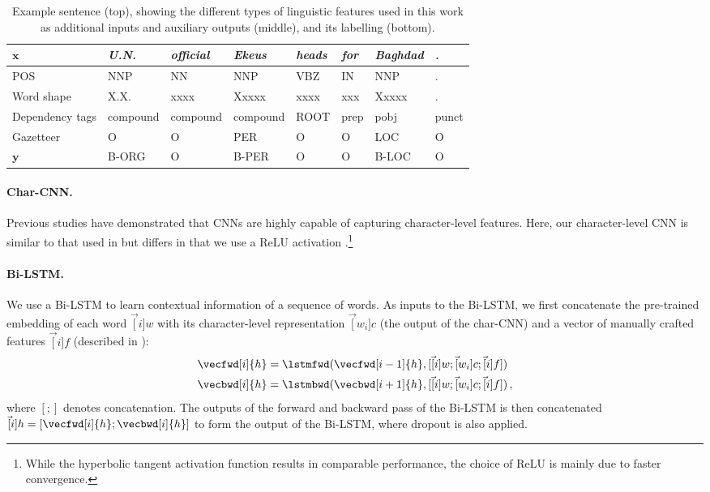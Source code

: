 \begin{table}[!t]
\centering
\small
\begin{tabular}{llllllll}
\toprule
$\mathbf{x}$           & \em U.N.     & \em official & \em  Ekeus    & \em heads & \em for  & \em Baghdad & \em .     \\ 
\midrule
POS        & NNP      & NN       & NNP      & VBZ   & IN   & NNP     & .     \\ 
Word shape      & X.X.     & xxxx     & Xxxxx    & xxxx  & xxx  & Xxxxx   & .     \\ 
Dependency tags & compound & compound & compound & ROOT  & prep & pobj    & punct \\ 
Gazetteer       & O        & O        & PER      & O     & O    & LOC     & O     \\
\midrule
$\mathbf{y}$          & B-ORG      & O        & B-PER      & O     & O    & B-LOC     & O     \\ 
\bottomrule
\end{tabular}
\caption{Example sentence (top), showing the different types of linguistic features used in this work as additional inputs and auxiliary outputs (middle), and its labelling (bottom).}
\label{feature}
\end{table}

\paragraph{Char-CNN.} 
Previous studies \cite{santos2014learning, chiu2016named, ma2016end} have demonstrated that CNNs are highly capable of capturing character-level features. 
Here, our character-level CNN is similar to that used in  but differs in that we use a ReLU activation \cite{nair2010rectified}.\footnote{While the hyperbolic tangent activation function results in comparable performance, the choice of ReLU is mainly due to faster convergence.} 

\paragraph{Bi-LSTM.} 
We use a Bi-LSTM to learn contextual information of a sequence of words. 
As inputs to the Bi-LSTM, we first concatenate the pre-trained embedding of each word $\vec[i]{w}$ with its character-level representation $\vec[w_i]{c}$ (the output of the char-CNN) and a vector of manually crafted features $\vec[i]{f}$ (described in ): 
\begin{align}
\vecfwd[i]{h} &= \lstmfwd(\vecfwd[i-1]{h}, [\vec[i]{w};\vec[w_i]{c};\vec[i]{f}])\\
\vecbwd[i]{h} &= \lstmbwd(\vecbwd[i+1]{h}, [\vec[i]{w};\vec[w_i]{c};\vec[i]{f}])\,,
\end{align}
where $[;]$ denotes concatenation.
The outputs of the forward and backward pass of the Bi-LSTM is then concatenated $\vec[i]{h} = [\vecfwd[i]{h};\vecbwd[i]{h}]$ to form the output of the Bi-LSTM, where dropout is also applied.

